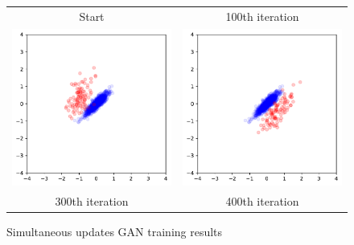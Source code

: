 \documentclass[12pt]{article}
\newcommand{\figw}{7cm}
\begin{document}
\begin{figure}
\begin{tabular}{cc}
Start & 100th iteration \\[6pt]
 \includegraphics[width=\figw]{hw2/codes/gan/plots/alternating/2.pdf} &   \includegraphics[width=\figw]{hw2/codes/gan/plots/alternating/3.pdf} \\
300th iteration & 400th iteration \\[6pt]
\end{tabular}
\caption{Simultaneous updates GAN training results}  \label{fig:simultaneous}
\end{figure}
\end{document}
